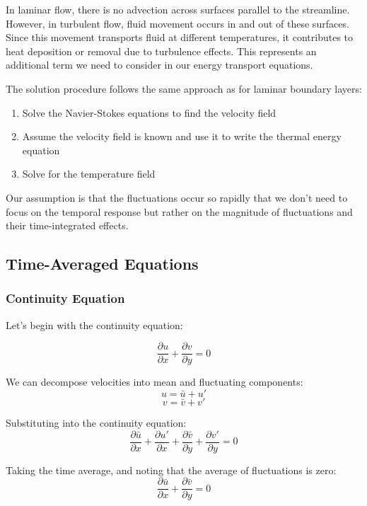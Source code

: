 In laminar flow, there is no advection across surfaces parallel to the streamline. However, in turbulent flow, fluid movement occurs in and out of these surfaces. Since this movement transports fluid at different temperatures, it contributes to heat deposition or removal due to turbulence effects. This represents an additional term we need to consider in our energy transport equations.

The solution procedure follows the same approach as for laminar boundary layers:
\begin{enumerate}
    \item Solve the Navier-Stokes equations to find the velocity field
    \item Assume the velocity field is known and use it to write the thermal energy equation
    \item Solve for the temperature field
\end{enumerate}
Our assumption is that the fluctuations occur so rapidly that we don't need to focus on the temporal response but rather on the magnitude of fluctuations and their time-integrated effects.
\subsection*{Time-Averaged Equations}
\subsubsection*{Continuity Equation}
Let's begin with the continuity equation:

\[
\frac{\partial u}{\partial x} + \frac{\partial v}{\partial y} = 0
\]

We can decompose velocities into mean and fluctuating components:
\[
u = \bar{u} + u'
\]
\[
v = \bar{v} + v'
\]

Substituting into the continuity equation:
\[
\frac{\partial \bar{u}}{\partial x} + \frac{\partial u'}{\partial x} + \frac{\partial \bar{v}}{\partial y} + \frac{\partial v'}{\partial y} = 0
\]

Taking the time average, and noting that the average of fluctuations is zero:
\[
\frac{\partial \bar{u}}{\partial x} + \frac{\partial \bar{v}}{\partial y} = 0
\]


